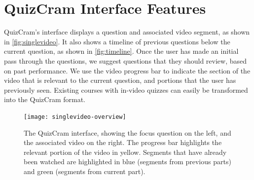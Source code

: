 \documentclass{sigchi}
\begin{document}
\section{QuizCram Interface Features}


QuizCram's interface displays a question and associated video segment, as shown in \autoref{fig:singlevideo}. It also shows a timeline of previous questions below the current question, as shown in \autoref{fig:timeline}. Once the user has made an initial pass through the questions, we suggest questions that they should review, based on past performance. We use the video progress bar to indicate the section of the video that is relevant to the current question, and portions that the user has previously seen. Existing courses with in-video quizzes can easily be transformed into the QuizCram format. 


\begin{figure}
\centering
\texttt{[image: singlevideo-overview]}
\caption{The QuizCram interface, showing the focus question on the left, and the associated video on the right. The progress bar highlights the relevant portion of the video in yellow. Segments that have already been watched are highlighted in blue (segments from previous parts) and green (segments from current part).}
\label{fig:singlevideo}
\end{figure}
\end{document}
